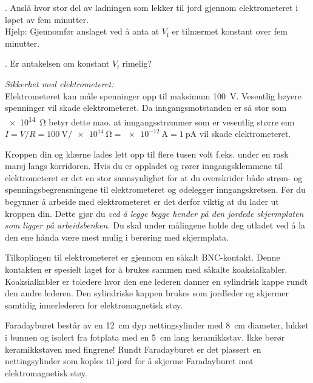 \documentclass[../Elmag-labhefte-2020.tex]{subfiles}
\begin{document}
{. Anslå hvor stor del av ladningen som lekker til jord gjennom elektrometeret i løpet av fem minutter.}
\\
Hjelp: Gjennomfør anslaget ved å anta at $V_\text{f}$ er tilnærmet konstant over fem minutter.

{. Er antakelsen om konstant $V_\text{f}$ rimelig?}

\emph{Sikkerhet med elektrometeret:}\\
Elektrometeret kan måle spenninger opp til maksimum \SI{100}{\volt}. Vesentlig høyere spenninger vil skade elektrometeret. Da inngangsmotstanden er så stor som \SI{e14}{\ohm} betyr dette mao. at inngangsstrømmer som er vesentlig større enn $I = V/R = \SI{100}{\volt} / \SI{e14}{\ohm} = \SI{e-12}{\ampere} = \SI{1}{\pico\ampere}$ vil skade elektrometeret.

Kroppen din og klærne lades lett opp til flere tusen volt f.eks. under en rask marsj langs korridoren. Hvis du er oppladet og rører inngangsklemmene til elektrometeret er det en stor sannsynlighet for at du overskrider både strøm- og spenningsbegrensningene til elektrometeret og ødelegger inngangskretsen. Før du begynner å arbeide med elektrometeret er det derfor viktig at du lader ut kroppen din. Dette gjør du \emph{ved å legge begge hender på den jordede skjermplaten som ligger på arbeidsbenken.} Du skal under målingene holde deg utladet ved å la den ene hånda være mest mulig i berøring med skjermplata.

Tilkoplingen til elektrometeret er gjennom en såkalt BNC-kontakt. Denne kontakten er spesielt laget for å brukes sammen med såkalte koaksialkabler. Koaksialkabler er toledere hvor den ene lederen danner en sylindrisk kappe rundt den andre lederen. Den sylindriske kappen brukes som jordleder og skjermer samtidig innerlederen for elektromagnetisk støy. 


Faradayburet består av en \SI{12}{\cm} dyp nettingsylinder med \SI{8}{\cm} diameter, lukket i bunnen og isolert fra fotplata med en \SI{5}{\cm} lang keramikkstav. Ikke berør keramikkstaven med fingrene!  Rundt Faradayburet er det plassert en nettingsylinder som koples til jord for å skjerme Faradayburet mot elektromagnetisk støy. 
\end{document}
